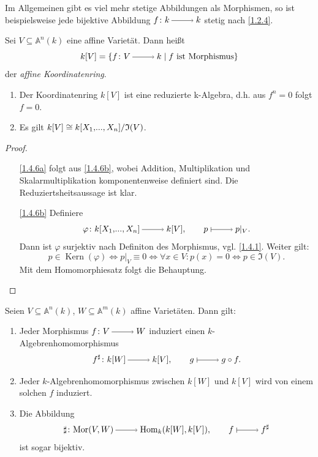 \documentclass[a4paper,12pt]{scrbook}
\newtheorem{proof}{Beweis}
\def\A{\mathbb{A}}
\def\I{\mathfrak{I}}
\newcommand{\Hom}{\mathrm{Hom}}
\newcommand{\Mor}{\mathrm{Mor}}
\newcommand{\Kern}{\operatorname{Kern}}
\renewcommand{\phi}{\varphi}
\newcommand{\restrict}[1]{|_{#1}}
\renewcommand{\dotsc}{\ensuremath{\!...}}
\newcommand{\ra}{\raisebox{-1pt}{\tikz{\draw[thin,shorten >=3pt, ->] (0,0) node{\hspace*{-2pt}} -- node{} (1,0);}}\penalty1000\relax}
\renewcommand{\mapsto}{\raisebox{-1pt}{\tikz{\draw[thin,shorten >=3pt, |->] (0,0) node{\hspace*{0pt}} -- node{} (1,0);}}\penalty1000\relax}
\newcommand{\Quotient}[2]{
  \mathchoice
  { %
    \raisebox{0.7ex}{\ensuremath{#1}}
    \ensuremath{\mkern-3mu}\big/\ensuremath{\mkern-3mu}
    \raisebox{-0.6ex}{\ensuremath{#2}}
  }
  { %
    #1/#2
  }
  { %
    #1/#2
  }
  { %
    #1/#2
  }
}
\newcommand{\polyx}[1][n]{\ensuremath%
  [X_{1},\dotsc,X_{#1}]}
\begin{document}
\begin{w}
Im Allgemeinen gibt es viel mehr stetige Abbildungen als Morphismen, so ist beispielsweise jede bijektive Abbildung $f\colon k\ra k$ stetig nach \cref{1.2.4}.
\end{w}

\begin{dfn}\label{1.4.5}
Sei $V\subseteq \A^n(k)$ eine affine Varietät. Dann heißt 
\[k[V]=\{f\colon V\ra k \mid f\text{ ist Morphismus\}}\]
 der \emph{affine Koordinatenring}.
\end{dfn}

\begin{bem}
\begin{enumerate}
\item{} Der Koordinatenring $k[V]$ ist eine reduzierte k-Algebra, d.h. aus $f^n=0$ folgt $f=0$.
\item{} Es gilt $k[V] \cong \Quotient{k\polyx}{\I(V)}$.
\end{enumerate}
\end{bem}

\begin{proof}
\begin{enumerate}
\item[\ref{1.4.6a}] folgt aus \ref{1.4.6b}, wobei Addition, Multiplikation und Skalarmultiplikation komponentenweise definiert sind. Die Reduziertsheitsaussage ist klar.
\item[\ref{1.4.6b}] Definiere
\[\phi\colon  k\polyx\ra k[V],  \qquad p\mapsto p\restrict{V}.\]
Dann ist $\phi$ surjektiv nach Definiton des Morphismus, vgl. \cref{1.4.1}. Weiter gilt:
\[p \in \Kern(\phi) \iff p\restrict{V} \equiv 0 \iff \forall x\in V\colon p(x)=0 \iff p\in \I(V).\] 
Mit dem Homomorphiesatz folgt die Behauptung. 
\end{enumerate}
\end{proof}

\begin{bem}\label{1.4.7} Seien $V\subseteq \A^n(k)$, $W\subseteq \A^m(k)$ affine Varietäten. Dann gilt:
\begin{enumerate}
\item{} Jeder Morphismus $f\colon V\ra W$ induziert einen $k$-Algebrenhomomorphismus
\[f^\sharp\colon  k[W]\ra k[V], \qquad g\mapsto g\circ f.\]
\item{} Jeder $k$-Algebrenhomomorphismus zwischen $k[W]$ und $k[V]$ wird von einem solchen $f$ induziert.
\item{} Die Abbildung 
\[\sharp\colon \Mor(V,W)\ra \Hom_k(k[W],k[V]), \qquad f\mapsto f^{\sharp}\]
ist sogar bijektiv.
\end{enumerate}
\end{bem}
\end{document}

